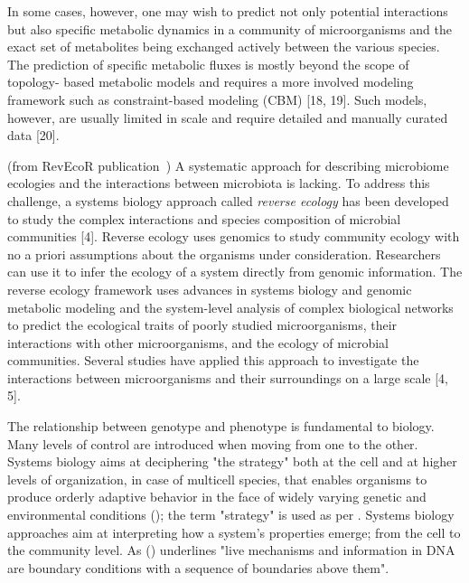       In some cases, however, one may wish to predict not only potential interactions
      but also specific metabolic dynamics in a community of microorganisms and the
      exact set of metabolites being exchanged actively between the various species. The
      prediction of specific metabolic fluxes is mostly beyond the scope of topology-
      based metabolic models and requires a more involved modeling framework such
      as constraint-based modeling (CBM) [18, 19]. Such models, however, are usually
      limited in scale and require detailed and manually curated data [20].







      (from RevEcoR publication~\cite{cao2016revecor})
      A systematic approach for describing microbiome ecologies and the interactions between microbiota is lacking. 
      To address this challenge, a systems biology approach called \textit{reverse ecology} has been developed 
      to study the complex interactions and species composition of microbial communities [4]. 
      Reverse ecology uses genomics to study community ecology with no a priori assumptions about the organisms under consideration. 
      Researchers can use it to infer the ecology of a system directly from genomic information. 
      The reverse ecology framework uses advances in systems biology and genomic metabolic modeling and 
      the system-level analysis of complex biological networks to predict the ecological traits of poorly studied microorganisms, 
      their interactions with other microorganisms, and the ecology of microbial communities. 
      Several studies have applied this approach to investigate the interactions between microorganisms 
      and their surroundings on a large scale [4, 5].

      The relationship between genotype and phenotype is fundamental to biology.
      Many levels of control are introduced when moving from one to the other. 
      Systems biology aims at deciphering "the strategy" both at the cell and at higher levels of organization, in case of multicell species, that enables organisms to produce orderly adaptive behavior in the face of widely varying genetic and environmental conditions (\cite{strohman2002maneuvering}); 
      the term "strategy" is used as per \cite{polanyi1968life}.
      Systems biology approaches aim at interpreting how a system's properties emerge; 
      from the cell to the community level.
      As \citeauthor{polanyi1968life} (\citeyear{polanyi1968life}) underlines 
      "live mechanisms and information in DNA are boundary conditions with a sequence of boundaries above them". 




